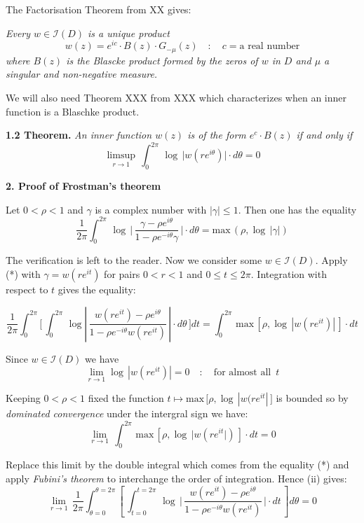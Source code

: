 \documentclass{amsart}
\def\vvv{-}
\begin{document}
\noindent 
The
Factorisation Theorem from XX gives:
\medskip



\emph{Every $w\in\mathcal I(D)$ is a unique product}
\[ w(z)=e^{ic}\cdot B(z)\cdot G_{\vvv \mu}(z)\quad\colon\quad  c=\text{a real number}
\]
\emph{where $B(z)$ is the Blascke product formed by the zeros of
$w$ in $D$ and $\mu$  a singular and non-negative measure.}
\medskip

\noindent
We will also need Theorem  XXX from XXX
which characterizes when an inner function is a Blaschke product.
\medskip


\noindent 
{\bf 1.2 Theorem.} \emph{An inner function $w(z)$ is
of the form $e^{c}\cdot B(z)$ if and only if}
\[
\limsup_{r\to 1}
\,\int_0^{2\pi}\,
\log\,\bigl|w(re^{i\theta})\bigr|\cdot d\theta=0
\]
\bigskip







\centerline{ \bf\large 2. Proof of Frostman's theorem}
\bigskip


\noindent
Let $0<\rho<1$ and  $\gamma$ is a complex number
with $|\gamma|\leq 1$. Then one has the equality
\[
\frac{1}{2\pi}\int_0^{2\pi}\,
\log\,\bigl |\,\frac{\gamma-\rho e^{i\theta}}{1-\rho e^{-i\theta}\gamma}\,\bigr |
\cdot d\theta
=\text{max}\,(\rho,\log\,|\gamma|)\tag{*}
\]


\noindent
The verification is left to the reader.
Now we consider some
$w\in\mathcal I(D)$. Apply (*) with 
$\gamma=w(re^{it})$ for pairs $0<r<1$ and $0\leq t\leq2\pi$.
Integration with respect to $t$  gives the equality:


\[
\frac{1}{2\pi}\int_0^{2\pi}\bigl[\,\int_0^{2\pi}\,
\log|\,\frac{w(re^{it})-\rho e^{i\theta}}{1-\rho e^{-i\theta}w(re^{it})}\,|
\cdot d\theta\,\bigr ] dt
=
\int_0^{2\pi}\,\text{max}\,[\rho,\log\,|w(re^{it})|\,]\cdot dt\tag{*}
\]


\noindent
Since $w\in\mathcal I(D)$ we have
\[
\lim_{r\to 1}\log\,|w(re^{it})|=0
\quad\colon\quad\text{for almost all}\,\,\,t\tag{i}
\]


\noindent
Keeping  $0<\rho<1$  fixed the function
$t\mapsto\text{max}\,\bigl [\rho,\log\,|w(re^{it}|\,\bigr ]$ is bounded
so
by \emph{dominated convergence} under the intergral sign we have:
\[
\lim_{r\to 1}\,\int_0^{2\pi}\,
\text{max}\,[\rho,\log\,|w(re^{it}|)\,]\cdot dt=0\tag{ii}
\]


\noindent
Replace this limit by the double integral which comes from the equality (*)
and apply
\emph{Fubini's theorem} to
interchange the order of integration. Hence (ii)  gives:
\[
\lim_{r\to 1}\,\frac{1}{2\pi}\int_{\theta=0}^{\theta=2\pi}
[\,\int_{t=0}^{t=2\pi}\,
\log\,\bigl |\,\frac{w(re^{it})-\rho e^{i\theta}}{1-\rho e^{-i\theta}w(re^{it})}\,
\bigr |
\cdot dt\,] d\theta=0\tag{iii}
\]
\medskip
\end{document}
